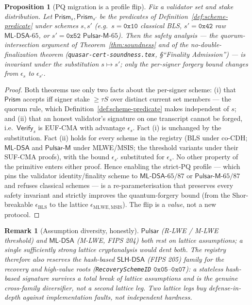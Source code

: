 \documentclass[11pt]{article}
\newtheorem{proposition}[theorem]{Proposition}
\newtheorem{remark}[theorem]{Remark}
\begin{document}
\begin{proposition}[PQ migration is a profile flip]
\label{prop:profile-flip}
Fix a validator set and stake distribution. Let
$\mathsf{Prism}_s, \mathsf{Prism}_{s'}$ be the predicates of
Definition~\ref{def:scheme-predicate} under schemes $s, s'$ (e.g.\
$s=\texttt{0x10}$ classical BLS, $s'=\texttt{0x42}$ raw
$\mathsf{ML\text{-}DSA}\text{-}65$, or $s'=\texttt{0x52}$
$\mathsf{Pulsar\text{-}M}\text{-}65$). Then the safety analysis --- the
quorum-intersection argument of Theorem~\ref{thm:soundness} and of the
no-double-finalization theorem
(\texttt{quasar-cert-soundness.tex}, \S``Finality Admission'') --- is
\emph{invariant} under the substitution $s \mapsto s'$; only the
per-signer forgery bound changes from $\epsilon_s$ to $\epsilon_{s'}$.
\end{proposition}
\begin{proof}
Both theorems use only two facts about the per-signer scheme: (i) that
$\mathsf{Prism}$ accepts iff signer stake $\ge \tau S$ over distinct
current set members --- the quorum rule, which
Definition~\ref{def:scheme-predicate} makes independent of $s$; and (ii)
that an honest validator's signature on one transcript cannot be forged,
i.e.\ $\mathsf{Verify}_s$ is EUF-CMA with advantage $\epsilon_s$. Fact
(i) is unchanged by the substitution. Fact (ii) holds for every scheme
in the registry (BLS under co-CDH; $\mathsf{ML\text{-}DSA}$ and
$\mathsf{Pulsar\text{-}M}$ under MLWE/MSIS; the threshold variants under
their SUF-CMA proofs), with the bound $\epsilon_{s'}$ substituted for
$\epsilon_s$. No other property of the primitive enters either proof.
Hence enabling the strict-PQ profile --- which pins the validator
identity/finality scheme to $\mathsf{ML\text{-}DSA}\text{-}65/87$ or
$\mathsf{Pulsar\text{-}M}\text{-}65/87$ and refuses classical schemes
--- is a re-parameterisation that preserves every safety invariant and
strictly improves the quantum-forgery bound (from the Shor-breakable
$\epsilon_{\mathrm{BLS}}$ to the lattice $\epsilon_{\mathrm{MLWE,MSIS}}$).
The flip is a \emph{value}, not a new protocol.
\end{proof}

\begin{remark}[Assumption diversity, honestly]
\label{rem:assumption-diversity}
$\mathsf{Pulsar}$ (R-LWE / M-LWE threshold) and $\mathsf{ML\text{-}DSA}$
(M-LWE, FIPS 204) both rest on \emph{lattice} assumptions; a single
sufficiently strong lattice cryptanalysis would dent both. The registry
therefore also reserves the hash-based $\mathsf{SLH\text{-}DSA}$
(FIPS 205) family for the recovery and high-value roots
(\texttt{RecoverySchemeID} $\texttt{0x05}$--$\texttt{0x07}$): a stateless
hash-based signature survives a total break of lattice assumptions and
is the genuine cross-family diversifier, not a second lattice leg. Two
lattice legs buy defense-in-depth against implementation faults, not
independent hardness.
\end{remark}
\end{document}
